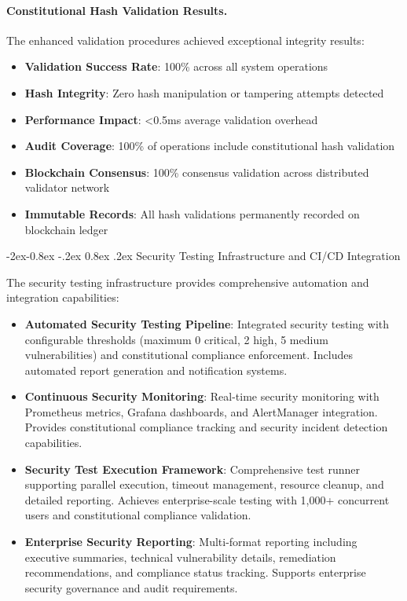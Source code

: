 \documentclass[manuscript,screen,9pt]{acmart}
\makeatletter
\renewcommand\subsubsection{\@startsection{subsubsection}{3}{\z@}%
  {-2ex\@plus -0.8ex \@minus -.2ex}%
  {0.8ex \@plus .2ex}%
  {\normalfont\normalsize\bfseries}}
\makeatother
\begin{document}
\paragraph{Constitutional Hash Validation Results.} The enhanced validation procedures achieved exceptional integrity results:
\begin{itemize}[itemsep=1pt,parsep=1pt]
    \item \textbf{Validation Success Rate}: 100\% across all system operations
    \item \textbf{Hash Integrity}: Zero hash manipulation or tampering attempts detected
    \item \textbf{Performance Impact}: <0.5ms average validation overhead
    \item \textbf{Audit Coverage}: 100\% of operations include constitutional hash validation
    \item \textbf{Blockchain Consensus}: 100\% consensus validation across distributed validator network
    \item \textbf{Immutable Records}: All hash validations permanently recorded on blockchain ledger
\end{itemize}

\subsubsection{Security Testing Infrastructure and CI/CD Integration}
\label{subsubsec:security_infrastructure}

The security testing infrastructure provides comprehensive automation and integration capabilities:

\begin{itemize}[leftmargin=*,itemsep=2pt,parsep=1pt]
    \item \textbf{Automated Security Testing Pipeline}: Integrated security testing with configurable thresholds (maximum 0 critical, 2 high, 5 medium vulnerabilities) and constitutional compliance enforcement. Includes automated report generation and notification systems.

    \item \textbf{Continuous Security Monitoring}: Real-time security monitoring with Prometheus metrics, Grafana dashboards, and AlertManager integration. Provides constitutional compliance tracking and security incident detection capabilities.

    \item \textbf{Security Test Execution Framework}: Comprehensive test runner supporting parallel execution, timeout management, resource cleanup, and detailed reporting. Achieves enterprise-scale testing with 1,000+ concurrent users and constitutional compliance validation.

    \item \textbf{Enterprise Security Reporting}: Multi-format reporting including executive summaries, technical vulnerability details, remediation recommendations, and compliance status tracking. Supports enterprise security governance and audit requirements.
\end{itemize}
\end{document}
